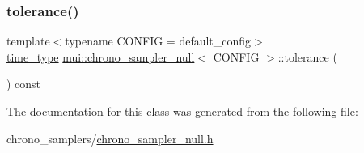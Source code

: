 \subsubsection{\texorpdfstring{tolerance()}{tolerance()}}
{\footnotesize\ttfamily template$<$typename C\+O\+N\+F\+IG  = default\+\_\+config$>$ \\
\hyperlink{classmui_1_1chrono__sampler__null_a5a14f1c66478264e3fb50ba4fda7d78c}{time\+\_\+type} \hyperlink{classmui_1_1chrono__sampler__null}{mui\+::chrono\+\_\+sampler\+\_\+null}$<$ C\+O\+N\+F\+IG $>$\+::tolerance (\begin{DoxyParamCaption}{ }\end{DoxyParamCaption}) const\hspace{0.3cm}{\ttfamily [inline]}}



The documentation for this class was generated from the following file\+:\begin{DoxyCompactItemize}
\item 
chrono\+\_\+samplers/\hyperlink{chrono__sampler__null_8h}{chrono\+\_\+sampler\+\_\+null.\+h}\end{DoxyCompactItemize}
